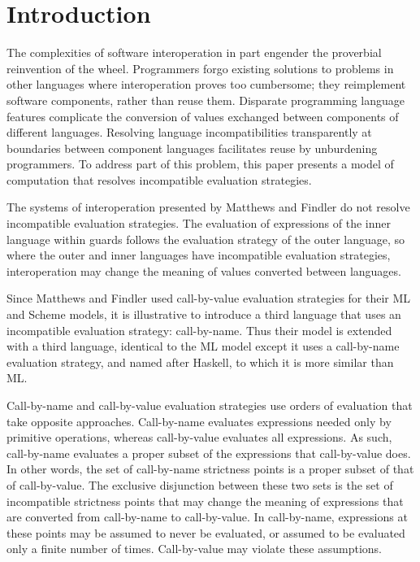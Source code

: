 \section{Introduction}

The complexities of software interoperation in part engender the proverbial reinvention of the wheel. Programmers forgo existing solutions to problems in other languages where interoperation proves too cumbersome; they reimplement software components, rather than reuse them. Disparate programming language features complicate the conversion of values exchanged between components of different languages. Resolving language incompatibilities transparently at boundaries between component languages facilitates reuse by unburdening programmers. To address part of this problem, this paper presents a model of computation that resolves incompatible evaluation strategies.

The systems of interoperation presented by Matthews and Findler \cite{matthews07} do not resolve incompatible evaluation strategies. The evaluation of expressions of the inner language within guards follows the evaluation strategy of the outer language, so where the outer and inner languages have incompatible evaluation strategies, interoperation may change the meaning of values converted between languages.

Since Matthews and Findler used call-by-value evaluation strategies for their ML and Scheme models, it is illustrative to introduce a third language that uses an incompatible evaluation strategy: call-by-name. Thus their model is extended with a third language, identical to the ML model except it uses a call-by-name evaluation strategy, and named after Haskell, to which it is more similar than ML.

Call-by-name and call-by-value evaluation strategies use orders of evaluation that take opposite approaches. Call-by-name evaluates expressions needed only by primitive operations, whereas call-by-value evaluates all expressions. As such, call-by-name evaluates a proper subset of the expressions that call-by-value does. In other words, the set of call-by-name strictness points is a proper subset of that of call-by-value. The exclusive disjunction between these two sets is the set of incompatible strictness points that may change the meaning of expressions that are converted from call-by-name to call-by-value. In call-by-name, expressions at these points may be assumed to never be evaluated, or assumed to be evaluated only a finite number of times. Call-by-value may violate these assumptions.

